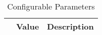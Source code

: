 \begin{landscape}
\begin{table}[H]
  \centering
  \begin{tabular}{|l|c|p{9cm}|}

    \hline
    \rowcolor{iob-green}
    \multicolumn{1}{|c}{\bf Name} & \multicolumn{1}{|c|}{\bf Value} & \multicolumn{1}{c|}{\bf Description}  \\ \hline \hline

    

  \end{tabular}
  \caption{Configurable Parameters}
  \label{cfg_param:is}
\end{table}
\end{landscape}
